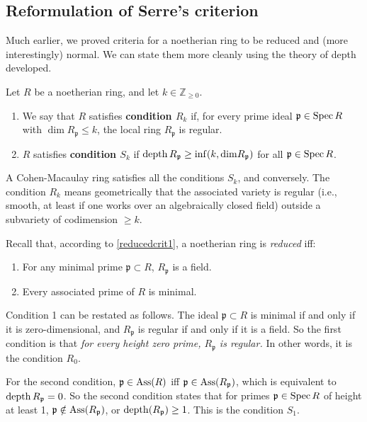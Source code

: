 \subsection{Reformulation of Serre's criterion}

Much earlier, we proved criteria for a noetherian ring to be reduced and (more
interestingly) normal.
We can state them more cleanly using the theory of depth developed.

\begin{definition} 
Let $R$ be a noetherian ring, and let $k \in \mathbb{Z}_{\geq 0}$.
\begin{enumerate}
\item We say that $R$ satisfies \textbf{condition $R_k$} if, for every
prime ideal $\mathfrak{p} \in \operatorname{Spec} R$ with $\dim R_{\mathfrak{p}} \leq k$,
the local ring $R_{\mathfrak{p}}$ is regular.
\item $R$ satisfies \textbf{condition $S_k$} if $\operatorname{depth} R_{\mathfrak{p}} \geq
\inf(k, \mathrm{dim} R_{\mathfrak{p}})$ for all $\mathfrak{p} \in \operatorname{Spec} R$.
\end{enumerate}
\end{definition} 

A Cohen-Macaulay ring satisfies all the conditions $S_k$, and conversely. The
condition $R_k$ means geometrically that the associated variety 
is regular (i.e., smooth, at least if one works over an algebraically closed
field) outside a subvariety of codimension $\geq k$.



Recall that, according to \cref{reducedcrit1}, a noetherian ring is \textit{reduced} iff:
\begin{enumerate}
\item For any minimal prime $\mathfrak{p} \subset R$,
$R_{\mathfrak{p}}$ is a
field.
\item Every associated prime of $R$ is minimal.
\end{enumerate}

Condition 1 can be restated as follows. The ideal
$\mathfrak{p}\subset R$ is
minimal if and only if it is zero-dimensional, and $R_{\mathfrak{p}}$  is
regular if and only if it is a
field. So the first condition is that \emph{for every height
zero prime,
$R_{\mathfrak{p}}$ is regular.}
In other words, it is the condition $R_0$.

For the second condition,
$\mathfrak{p} \in
\operatorname{Ass}(R)$ iff $\mathfrak{p} \in \operatorname{Ass}(R_{\mathfrak{p}})$, which is
equivalent to
$\operatorname{depth} R_{\mathfrak{p}} = 0$. So the second condition states that for primes
$\mathfrak{p} \in \operatorname{Spec} R$ of height at least 1, $\mathfrak{p} \notin
\operatorname{Ass}(R_{\mathfrak{p}})$, or $\operatorname{depth}(R_{\mathfrak{p}}) \geq 1$. This
is the condition $S_1$.

